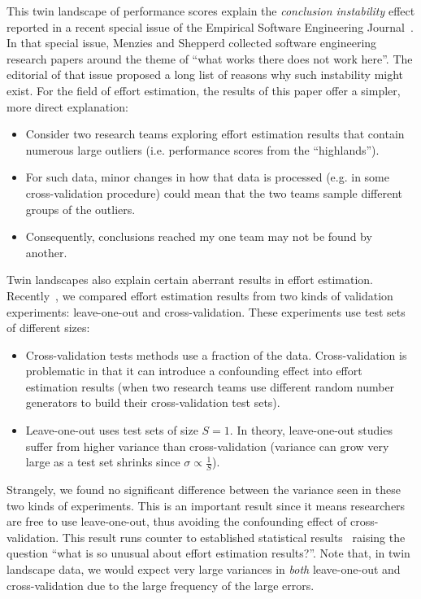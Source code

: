 \documentclass{sig-alternate}
\newcommand{\bi}{\begin{itemize}}
\newcommand{\ei}{\end{itemize}}
\begin{document}
This twin landscape of performance scores explain the {\em
  conclusion instability} effect reported in a recent special issue of
the Empirical Software Engineering Journal~\cite{ci12}. 
In that special issue,
Menzies and Shepperd collected software engineering research papers
around the theme of ``what works there does not work here''.
The editorial of that issue proposed a long list of reasons
why such instability might exist. 
For the field of effort estimation, the results of this paper
offer a simpler, more direct explanation: \bi
\item Consider two research teams exploring effort estimation results
that  contain numerous large outliers (i.e.
performance scores from the ``highlands'').  
\item
For such data,
minor changes in how that data is processed
(e.g. in some cross-validation procedure) could mean that the two teams sample different groups
of the outliers.
\item Consequently, conclusions reached my one team may not be found by another.
\ei
Twin landscapes also explain  certain 
aberrant results in effort estimation.
Recently~\cite{koc13a}, we compared effort estimation
results from two kinds of validation experiments:   leave-one-out and cross-validation.
These experiments use test sets of different sizes:
\bi
\item Cross-validation tests
methods use a fraction of the data.
Cross-validation is problematic in that it
can introduce a confounding effect into effort estimation results
(when two research teams use different random number generators to build their cross-validation
test sets).
\item
Leave-one-out uses test sets of size $S=1$.
In theory, leave-one-out studies suffer from higher variance than
cross-validation (variance can grow very large as a test set shrinks since $\sigma \propto \frac{1}{S}$).
\ei
Strangely, 
we found no significant difference between the  variance
seen in these two kinds of experiments.
This is an important result since it means researchers are free to use leave-one-out, thus
avoiding the confounding effect of cross-validation. This result runs counter
to established statistical results~\cite{Mendes2007}
raising the question ``what is so unusual
about effort estimation results?''. 
 Note that,  in twin landscape data, 
we would expect very large variances in {\em both}
leave-one-out and cross-validation due to the
large frequency of the large errors. 
\end{document}
